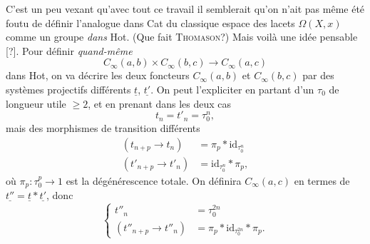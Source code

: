 \documentclass[11pt]{article}
\begin{document}
C'est un peu vexant qu'avec tout ce travail il semblerait qu'on n'ait pas même été foutu de définir l'analogue dans Cat du classique espace des lacets $\Omega(X, x)$ comme un groupe \textit{dans} Hot. (Que fait \textsc{Thomason}?) Mais voilà une idée pensable [?]. Pour définir \textit{quand-même}
\[
C_\infty(a,b) \times C_\infty(b,c) \longrightarrow C_\infty(a,c)
\]
dans Hot, on va décrire les deux foncteurs $C_\infty(a,b)$ et $C_\infty(b,c)$ par des systèmes projectifs différents $\underline{t}$, $\underline{t'}$. On peut l'expliciter en partant d'un $\tau_0$ de longueur utile $\geq 2$, et en prenant dans les deux cas
\[
t_n = t'_n = \tau_0^n,
\]
mais des morphismes de transition différents
\[
\begin{aligned}
(t_{n+p} \longrightarrow t_n) &= \pi_p * \mathrm{id}_{\tau_0^n} \\
(t'_{n+p} \longrightarrow t'_n) &= \mathrm{id}_{\tau_0^n} * \pi_p,
\end{aligned}
\]
où $\pi_p : \tau_0^p \longrightarrow 1$ est la dégénérescence totale. On définira $C_\infty(a,c)$ en termes de $\underline{t''} = \underline{t} * \underline{t'}$, donc
\[
\left\{
\begin{aligned}
t''_n &= \tau_0^{2n} \\
(t''_{n+p} \longrightarrow t''_n) &= \pi_p * \mathrm{id}_{\tau_0^{2n}} * \pi_p.
\end{aligned}
\right.
\]
\end{document}

